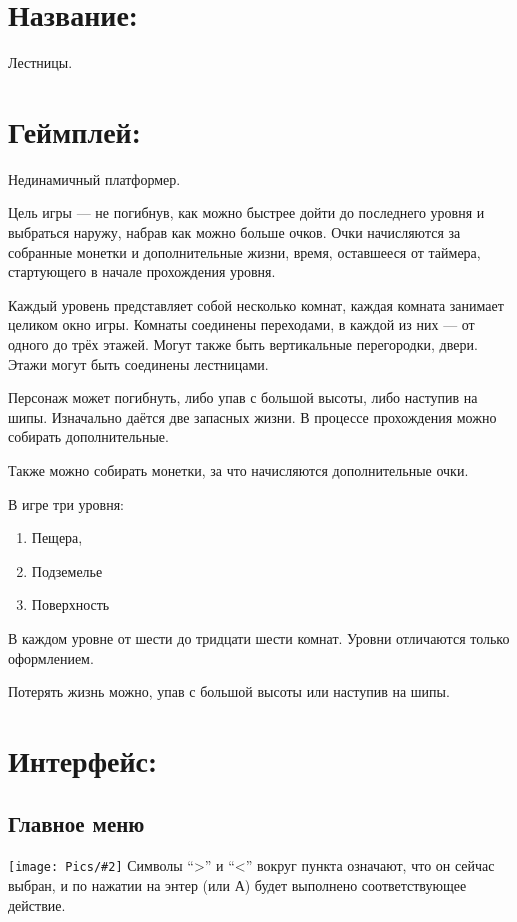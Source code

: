 \documentclass[12pt,a4paper]{article}
\begin{document}
\newcommand{\pic}[2] {
  \texttt{[image: Pics/\#2]}}

\section{Название:} Лестницы.
\section{Геймплей:} Нединамичный платформер.

Цель игры --- не погибнув, как можно быстрее дойти до последнего уровня и выбраться наружу, набрав как можно больше очков. Очки начисляются за собранные монетки и дополнительные жизни, время, оставшееся от таймера, стартующего в начале прохождения уровня.

Каждый уровень представляет собой несколько комнат, каждая комната занимает целиком окно игры. Комнаты соединены переходами, в каждой из них --- от одного до трёх этажей. Могут также быть вертикальные перегородки, двери. Этажи могут быть соединены лестницами.

Персонаж может погибнуть, либо упав с большой высоты, либо наступив на шипы. Изначально даётся две запасных жизни. В процессе прохождения можно собирать дополнительные.

Также можно собирать монетки, за что начисляются дополнительные очки.

В игре три уровня:
\begin{enumerate}
\item Пещера,
\item Подземелье
\item Поверхность
\end{enumerate}
В каждом уровне от шести до тридцати шести комнат. Уровни отличаются только оформлением.

Потерять жизнь можно, упав с большой высоты или наступив на шипы.

\section{Интерфейс:}
\subsection{Главное меню}

\noindent \pic{0.27}{mainmenu}
Символы ``>'' и ``<'' вокруг пункта означают, что он сейчас выбран, и по нажатии на энтер (или А) будет выполнено соответствующее действие.
\end{document}

